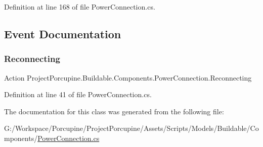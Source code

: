 Definition at line 168 of file Power\+Connection.\+cs.



\subsection{Event Documentation}
\mbox{\label{class_project_porcupine_1_1_buildable_1_1_components_1_1_power_connection_a33e21a0f2297ee283bb3f269a1b96491}} 
\subsubsection{\texorpdfstring{Reconnecting}{Reconnecting}}
{\footnotesize\ttfamily Action Project\+Porcupine.\+Buildable.\+Components.\+Power\+Connection.\+Reconnecting}



Definition at line 41 of file Power\+Connection.\+cs.



The documentation for this class was generated from the following file\+:\begin{DoxyCompactItemize}
\item 
G\+:/\+Workspace/\+Porcupine/\+Project\+Porcupine/\+Assets/\+Scripts/\+Models/\+Buildable/\+Components/\hyperlink{_power_connection_8cs}{Power\+Connection.\+cs}\end{DoxyCompactItemize}
